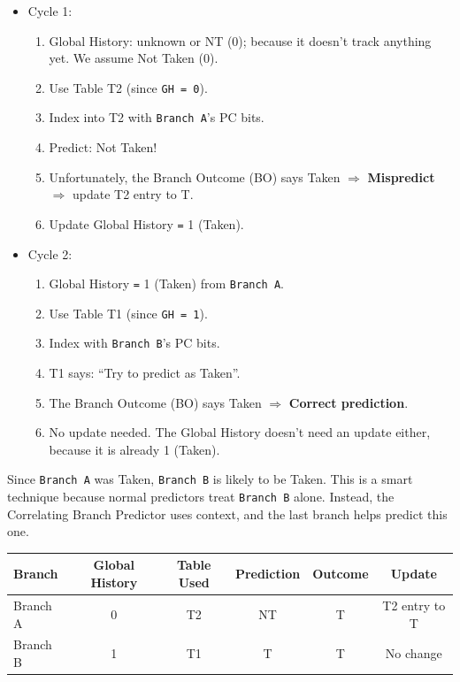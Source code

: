 \begin{itemize}
    \item Cycle 1: 
    \begin{enumerate}
        \item Global History: unknown or NT (0); because it doesn't track anything yet. We assume Not Taken (0).
        \item Use Table T2 (since \texttt{GH = 0}).
        \item Index into T2 with \texttt{Branch A}'s PC bits.
        \item[\textcolor{Green3}{\faIcon{magic}}] Predict: Not Taken!
        \item[\textcolor{Red2}{\faIcon{thumbs-down}}] Unfortunately, the Branch Outcome (BO) says Taken $\Rightarrow$ \textcolor{Red2}{ \textbf{Mispredict}} $\Rightarrow$ update T2 entry to T.
        \item Update Global History \texttt{=} 1 (Taken).
    \end{enumerate}

    \item Cycle 2: 
    \begin{enumerate}
        \item Global History \texttt{=} 1 (Taken) from \texttt{Branch A}.
        \item Use Table T1 (since \texttt{GH = 1}).
        \item Index with \texttt{Branch B}'s PC bits.
        \item[\textcolor{Green3}{\faIcon{magic}}] T1 says: ``Try to predict as Taken''.
        \item[\textcolor{Green3}{\faIcon{\speedIcon}}] The Branch Outcome (BO) says Taken $\Rightarrow$ \textcolor{Green3}{ \textbf{Correct prediction}}.
        \item No update needed. The Global History doesn't need an update either, because it is already 1 (Taken).
    \end{enumerate}
\end{itemize}
Since \texttt{Branch A} was Taken, \texttt{Branch B} is likely to be Taken. This is a smart technique because normal predictors treat \texttt{Branch B} alone. Instead, the Correlating Branch Predictor uses context, and the last branch helps predict this one.

\highspace
\begin{adjustbox}{width={\textwidth},totalheight={\textheight},keepaspectratio}
    \begin{tabular}{@{} l | c | c | c | c | c @{}}
        \toprule
        Branch   & Global History & Table Used & Prediction & Outcome & Update        \\
        \midrule
        Branch A & 0              & T2         & NT         & T       & T2 entry to T \\ [.5em]
        Branch B & 1              & T1         & T          & T       & No change     \\
        \bottomrule
    \end{tabular}
\end{adjustbox}

